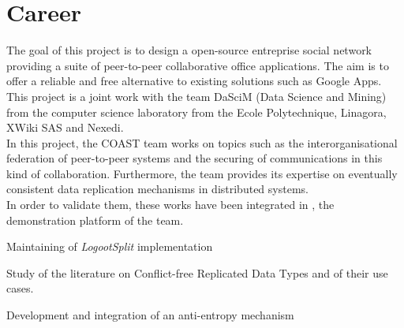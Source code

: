 \section{Career}

\sectionsep

\hfill\begin{minipage}{\dimexpr\textwidth-0.5cm}
The goal of this project is to design a  open-source entreprise social network providing a suite of
peer-to-peer collaborative office applications.
The aim is to offer a reliable and free alternative to existing solutions such as Google Apps.
This project is a joint work with the team DaSciM (Data Science and Mining) from the
computer science laboratory from the Ecole Polytechnique, Linagora, XWiki SAS and Nexedi.
\\
In this project, the COAST team works on topics such as the interorganisational federation of
peer-to-peer systems and the securing of communications in this kind of collaboration.
Furthermore, the team provides its expertise
on eventually consistent data replication mechanisms in distributed systems.
\\
In order to validate them, these works have been integrated in \href{https://www.coedit.re}{},
the demonstration platform of the team.
\begin{tightemize}
\item Maintaining of \emph{LogootSplit}\cite{sp2-l2-9}\cite{sp2-l2-10} implementation
\item Study of the literature on Conflict-free Replicated Data Types and of their use cases.
\item Development and integration of an anti-entropy mechanism\cite{sp2-l2-2}
\end{tightemize}
\sectionsep

\renewcommand\refname{\vskip -20pt} %


\nocite{*}


\end{minipage}
